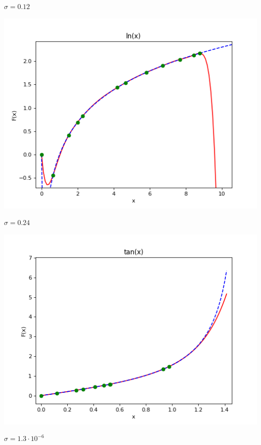\documentclass[12pt,a4paper]{scrartcl}
\begin{document}
		$\sigma = 0.12$ \\
		\begin{center}
			\includegraphics[scale=0.8]{figure_3} \\
		\end{center}
		$\sigma = 0.24$
		\begin{center}
			\includegraphics[scale=0.8]{figure_4} \\
		\end{center}
		$\sigma = 1.3 \cdot 10^{-6}$
\end{document}
